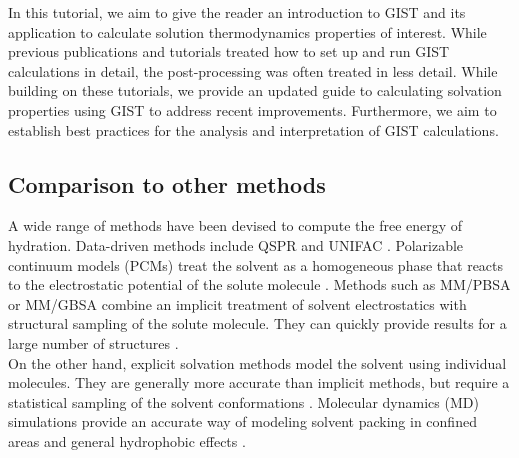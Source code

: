 \documentclass[9pt,tutorial]{livecoms}
\begin{document}
In this tutorial, we aim to give the reader an introduction to GIST and its application to calculate solution thermodynamics properties of interest. 
While previous publications \cite{Ramsey2016} and tutorials \cite{amber_tut_gist} treated how to set up and run GIST calculations in detail, the post-processing was often treated in less detail. 
While building on these tutorials, we provide an updated guide to calculating solvation properties using GIST to address recent improvements.
Furthermore, we aim to establish best practices for the analysis and interpretation of GIST calculations.

\subsection{Comparison to other methods}
A wide range of methods have been devised to compute the free energy of hydration.
Data-driven methods include QSPR and UNIFAC \cite{Borhani2019-qspr,Fredenslund1975-unifac}.
Polarizable continuum models (PCMs) \cite{Miertus1981-pcm,Klamt1993-cosmo} treat the solvent as a homogeneous phase that reacts to the electrostatic potential of the solute molecule \cite{Mennucci2010-pcm}.
Methods such as MM/PBSA or MM/GBSA \cite{Sitkoff1994-pbsa,Kollman2000-mmpbsa} combine an implicit treatment of solvent electrostatics with structural sampling of the solute molecule.
They can quickly provide results for a large number of structures \cite{Genheden2015-mmpbsa-review}.\\
On the other hand, explicit solvation methods model the solvent using individual molecules.
They are generally more accurate than implicit methods, but require a statistical sampling of the solvent conformations \cite{Liu2016-md-solubility,Swails2014-cphmd}.
Molecular dynamics (MD) simulations provide an accurate way of modeling solvent packing in confined areas \cite{Haider2016-water-on-surfaces} and general hydrophobic effects \cite{Pratt2016-hydrophobicity}.
\end{document}
